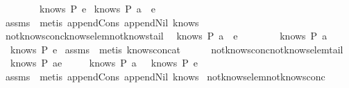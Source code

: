 \begin{isabellebody}
\ \ \ \ \ \ \ \ {\isachardoublequoteopen}knows\ P\ e{\isachardoublequoteclose}\isanewline
{}\ {\isachardoublequoteopen}knows\ P\ {\isacharparenleft}a\ {\isacharhash}\ e{\isacharparenright}{\isachardoublequoteclose}\isanewline
\isadelimproof
\endisadelimproof
\isatagproof
{}\isamarkupfalse \ assms\ \isamarkupfalse \ {\isacharparenleft}metis\ append{\isacharunderscore}Cons\ append{\isacharunderscore}Nil\ knows{}{\isacharparenright}\endisatagproof
{\isafoldproof}\isadelimproof
\isanewline
\endisadelimproof
\isanewline
{}\isamarkupfalse \ not{\isacharunderscore}knows{\isacharunderscore}conc{\isacharunderscore}knows{\isacharunderscore}elem{\isacharunderscore}not{\isacharunderscore}knows{\isacharunderscore}tail{\isacharcolon}\isanewline
{}\ {\isachardoublequoteopen}{\isasymnot}\ knows\ P\ {\isacharparenleft}a\ {\isacharhash}\ e{\isacharparenright}{\isachardoublequoteclose}\isanewline
\ \ \ \ \ \ \ \ {\isachardoublequoteopen}knows\ P\ {\isacharbrackleft}a{\isacharbrackright}{\isachardoublequoteclose}\isanewline
{}\ {\isachardoublequoteopen}{\isasymnot}\ knows\ P\ e{\isachardoublequoteclose}\isanewline
\isadelimproof
\endisadelimproof
\isatagproof
{}\isamarkupfalse \ assms\ \isamarkupfalse \ {\isacharparenleft}metis\ knows{\isacharunderscore}concat{\isacharunderscore}{}{\isacharparenright}\endisatagproof
{\isafoldproof}\isadelimproof
\isanewline
\endisadelimproof
\ \ \ \ \isanewline
{}\isamarkupfalse \ not{\isacharunderscore}knows{\isacharunderscore}conc{\isacharunderscore}not{\isacharunderscore}knows{\isacharunderscore}elem{\isacharunderscore}tail{\isacharcolon}\isanewline
{}\ {\isachardoublequoteopen}{\isasymnot}\ knows\ P\ {\isacharparenleft}a{\isacharhash}e{\isacharparenright}{\isachardoublequoteclose}\isanewline
{}\ \ \ \ {\isachardoublequoteopen}{\isasymnot}\ knows\ P\ {\isacharbrackleft}a{\isacharbrackright}\ {\isasymor}\ {\isasymnot}\ knows\ P\ e{\isachardoublequoteclose}\isanewline
\isadelimproof
\endisadelimproof
\isatagproof
{}\isamarkupfalse \ assms\ \isamarkupfalse \ {\isacharparenleft}metis\ append{\isacharunderscore}Cons\ append{\isacharunderscore}Nil\ knows{}{\isacharparenright}\endisatagproof
{\isafoldproof}\isadelimproof
\isanewline
\endisadelimproof
\isanewline
{}\isamarkupfalse \ not{\isacharunderscore}knows{\isacharunderscore}elem{\isacharunderscore}not{\isacharunderscore}knows{\isacharunderscore}conc{\isacharcolon}\isanewline

\end{isabellebody}
